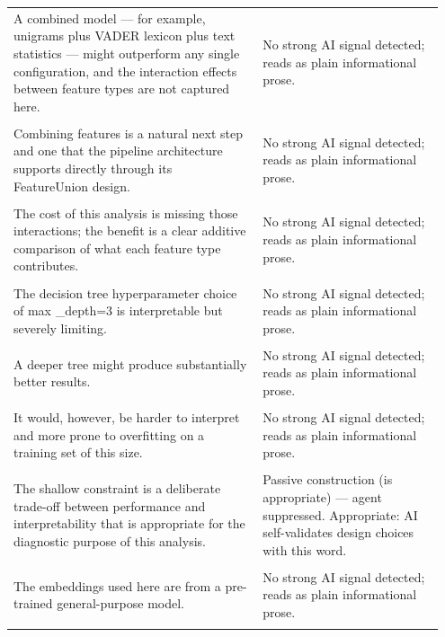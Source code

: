 \documentclass[11pt]{article}
\begin{document}
\begin{longtable}{|p{0.55\linewidth}|p{0.40\linewidth}|}
\hline
\rule{0pt}{3.5cm} & \\
\hline
A combined model --- for example, unigrams plus VADER lexicon plus text statistics --- might outperform any single configuration, and the interaction effects between feature types are not captured here. & No strong AI signal detected; reads as plain informational prose. \\[2pt]
\hline
\rule{0pt}{3.5cm} & \\
\hline
Combining features is a natural next step and one that the pipeline architecture supports directly through its FeatureUnion design. & No strong AI signal detected; reads as plain informational prose. \\[2pt]
\hline
\rule{0pt}{3.5cm} & \\
\hline
The cost of this analysis is missing those interactions; the benefit is a clear additive comparison of what each feature type contributes. & No strong AI signal detected; reads as plain informational prose. \\[2pt]
\hline
\rule{0pt}{3.5cm} & \\
\hline
The decision tree hyperparameter choice of max \_depth=3 is interpretable but severely limiting. & No strong AI signal detected; reads as plain informational prose. \\[2pt]
\hline
\rule{0pt}{3.5cm} & \\
\hline
A deeper tree might produce substantially better results. & No strong AI signal detected; reads as plain informational prose. \\[2pt]
\hline
\rule{0pt}{3.5cm} & \\
\hline
It would, however, be harder to interpret and more prone to overfitting on a training set of this size. & No strong AI signal detected; reads as plain informational prose. \\[2pt]
\hline
\rule{0pt}{3.5cm} & \\
\hline
The shallow constraint is a deliberate trade-off between performance and interpretability that is appropriate for the diagnostic purpose of this analysis. & Passive construction (is appropriate) --- agent suppressed. Appropriate: AI self-validates design choices with this word. \\[2pt]
\hline
\rule{0pt}{3.5cm} & \\
\hline
The embeddings used here are from a pre-trained general-purpose model. & No strong AI signal detected; reads as plain informational prose. \\[2pt]
\hline
\rule{0pt}{3.5cm} & \\

\end{longtable}
\end{document}
